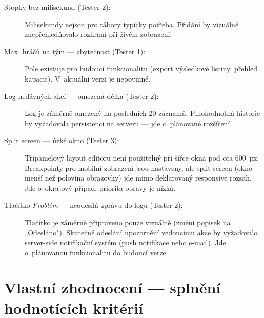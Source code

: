 ﻿\documentclass[a4paper,12pt]{article}
\begin{document}
\begin{description}
  \item[Stopky bez milisekund (Tester 2):]
    Milisekundy nejsou pro tábory typicky potřeba. Přidání by vizuálně
    znepřehledňovalo rozhraní při živém zobrazení.

  \item[Max. hráčů na tým — zbytečnost (Tester 1):]
    Pole existuje pro budoucí funkcionalitu (export výsledkové listiny, přehled
    kapacit). V~aktuální verzi je nepovinné.

  \item[Log nedávných akcí — omezená délka (Tester 2):]
    Log je záměrně omezený na posledních 20 záznamů. Plnohodnotná historie
    by vyžadovala persistenci na serveru — jde o~plánované rozšíření.

  \item[Split screen — úzké okno (Tester 3):]
    Třípamelový layout editoru není použitelný při šířce okna pod cca 600~px.
    Breakpointy pro mobilní zobrazení jsou nastaveny, ale split screen
    (okno menší než polovina obrazovky) jde mimo deklarovaný responsive rozsah.
    Jde o~okrajový případ; priorita opravy je nízká.

  \item[Tlačítko \emph{Problém} — neodesílá zprávu do logu (Tester 2):]
    Tlačítko je záměrně připraveno pouze vizuálně (změní popisek na
    „Odesláno"). Skutečné odeslání upozornění vedoucímu akce by vyžadovalo
    server-side notifikační systém (push notifikace nebo e-mail).
    Jde o~plánovanou funkcionalitu do budoucí verze.
\end{description}

\section{Vlastní zhodnocení — splnění hodnotících kritérií}
\end{document}
